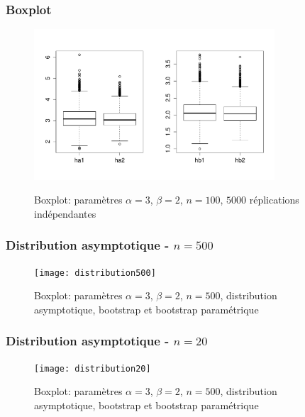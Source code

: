 \begin{frame}
\frametitle{Boxplot}
\begin{figure}
  \centering
  \includegraphics[width=0.8\textwidth]{boxplot1}\\
  \caption{Boxplot: paramètres $\alpha=3$, $\beta=2$, $n=100$, $5000$ réplications indépendantes}
\end{figure}
\end{frame}




\begin{frame}
\frametitle{Distribution asymptotique - $n=500$}
\begin{figure}
  \centering
  \texttt{[image: distribution500]}\\
  \caption{Boxplot: paramètres $\alpha=3$, $\beta=2$, $n=500$, distribution asymptotique, bootstrap et bootstrap paramétrique}
\end{figure}
\end{frame}

\begin{frame}
\frametitle{Distribution asymptotique - $n=20$}
\begin{figure}
  \centering
  \texttt{[image: distribution20]}\\
  \caption{Boxplot: paramètres $\alpha=3$, $\beta=2$, $n=500$, distribution asymptotique, bootstrap et bootstrap paramétrique}
\end{figure}

\end{frame}


 